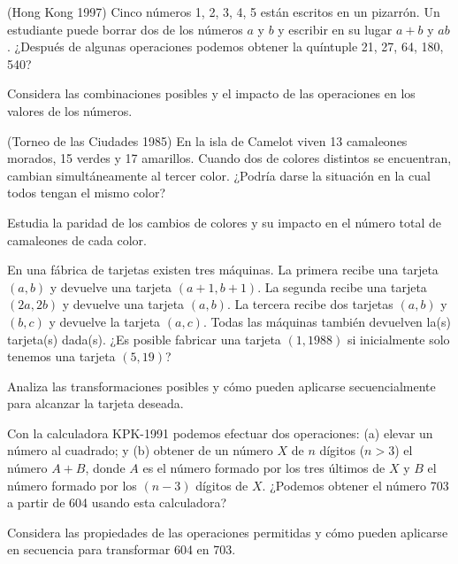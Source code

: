 \documentclass[11pt]{scrartcl}
\begin{document}
\begin{problem}
(Hong Kong 1997) Cinco números 1, 2, 3, 4, 5 están escritos en un pizarrón. Un estudiante puede borrar dos de los números \( a \) y \( b \) y escribir en su lugar \( a+b \) y \( ab \). ¿Después de algunas operaciones podemos obtener la quíntuple 21, 27, 64, 180, 540?
\begin{hint}
Considera las combinaciones posibles y el impacto de las operaciones en los valores de los números.
\end{hint}
\end{problem}

\begin{problem}
(Torneo de las Ciudades 1985) En la isla de Camelot viven 13 camaleones morados, 15 verdes y 17 amarillos. Cuando dos de colores distintos se encuentran, cambian simultáneamente al tercer color. ¿Podría darse la situación en la cual todos tengan el mismo color?
\begin{hint}
Estudia la paridad de los cambios de colores y su impacto en el número total de camaleones de cada color.
\end{hint}
\end{problem}

\begin{problem}
En una fábrica de tarjetas existen tres máquinas. La primera recibe una tarjeta \((a, b)\) y devuelve una tarjeta \((a+1, b+1)\). La segunda recibe una tarjeta \((2a, 2b)\) y devuelve una tarjeta \((a, b)\). La tercera recibe dos tarjetas \((a, b)\) y \((b, c)\) y devuelve la tarjeta \((a, c)\). Todas las máquinas también devuelven la(s) tarjeta(s) dada(s). ¿Es posible fabricar una tarjeta \((1, 1988)\) si inicialmente solo tenemos una tarjeta \((5, 19)\)?
\begin{hint}
Analiza las transformaciones posibles y cómo pueden aplicarse secuencialmente para alcanzar la tarjeta deseada.
\end{hint}
\end{problem}

\begin{problem}
Con la calculadora KPK-1991 podemos efectuar dos operaciones: (a) elevar un número al cuadrado; y (b) obtener de un número \( X \) de \( n \) dígitos (\( n > 3 \)) el número \( A + B \), donde \( A \) es el número formado por los tres últimos de \( X \) y \( B \) el número formado por los \( (n-3) \) dígitos de \( X \). ¿Podemos obtener el número 703 a partir de 604 usando esta calculadora?
\begin{hint}
Considera las propiedades de las operaciones permitidas y cómo pueden aplicarse en secuencia para transformar 604 en 703.
\end{hint}
\end{problem}
\end{document}
